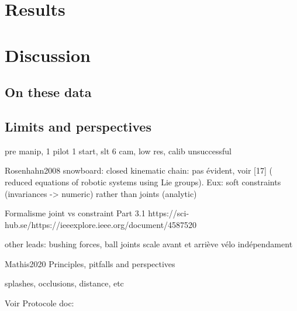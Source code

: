 \section{Results}



\section{Discussion}
\subsection{On these data}


\subsection{Limits and perspectives}

pre manip, 1 pilot 1 start, slt 6 cam, low res, calib unsuccessful

Rosenhahn2008 snowboard: closed kinematic chain: pas évident, voir [17] ( reduced equations of robotic systems using Lie groups). Eux: soft constraints (invariances -> numeric) rather than joints (analytic)

Formalisme joint vs constraint Part 3.1 https://sci-hub.se/https://ieeexplore.ieee.org/document/4587520

other leads: bushing forces, ball joints
scale avant et arriève vélo indépendament





Mathis2020 Principles, pitfalls and perspectives

splashes, occlusions, distance, etc

Voir Protocole doc: %
